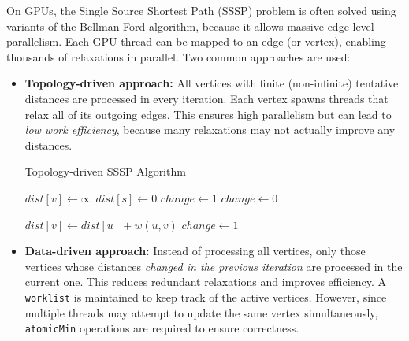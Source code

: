 \documentclass[12pt]{book}
\begin{document}
On GPUs, the Single Source Shortest Path (SSSP) problem is often solved using variants of the Bellman-Ford algorithm, because it allows massive edge-level parallelism. Each GPU thread can be mapped to an edge (or vertex), enabling thousands of relaxations in parallel. Two common approaches are used:

\begin{itemize}
    \item \textbf{Topology-driven approach:}  
    All vertices with finite (non-infinite) tentative distances are processed in every iteration. Each vertex spawns threads that relax all of its outgoing edges. This ensures high parallelism but can lead to \emph{low work efficiency}, because many relaxations may not actually improve any distances.
    
    \begin{algorithm}[H]
    \caption{Topology-driven SSSP Algorithm}
    \label{alg:topodriven}
    \begin{algorithmic}[1]
            \State $dist[v] \gets \infty$
        \EndFor
        \State $dist[s] \gets 0$
        \State $change \gets 1$
            \State $change \gets 0$
            \State {}
        \EndWhile
    \EndFunction
    
                        \State $dist[v] \gets dist[u] + w(u,v)$
                        \State $change \gets 1$
                    \EndIf
                \EndFor
            \EndIf
        \EndFor
    \EndFunction
    \end{algorithmic}
    \end{algorithm}
    
    \item \textbf{Data-driven approach:}  
    Instead of processing all vertices, only those vertices whose distances \emph{changed in the previous iteration} are processed in the current one. This reduces redundant relaxations and improves efficiency. A \texttt{worklist} is maintained to keep track of the active vertices. However, since multiple threads may attempt to update the same vertex simultaneously, \texttt{atomicMin} operations are required to ensure correctness.
    

\end{itemize}
\end{document}
